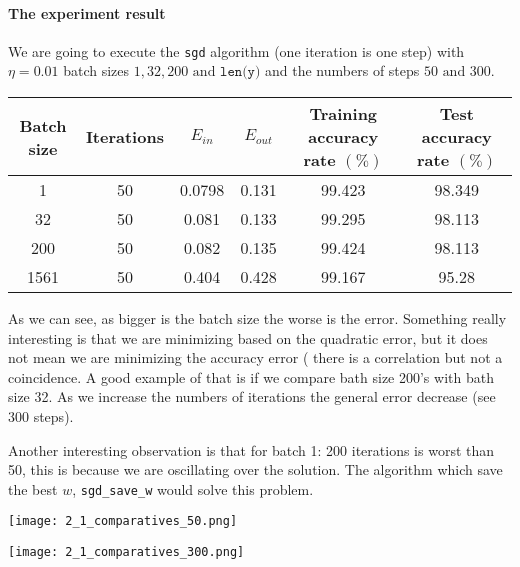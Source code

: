     \paragraph{The experiment result}  We are going to execute the \texttt{sgd} algorithm (one iteration is one step)  with $\eta = 0.01$ batch sizes $1,32, 200 \text{ and } \texttt{len(y)}$ and the numbers of steps $50 \text{ and } 300$.


   


\begin{table}[H]
\begin{tabular}{|c|c|c|c|c|c|}
\hline
   Batch size &  Iterations & $E_{in}$      & $E_{out}$                  & Training accuracy rate $(\%)$   & Test accuracy rate $(\%)$   \\ \hline
  1          &     50     &     0.0798    & 0.131                      &        99.423           & 98.349    \\ \hline
 32          &     50     &   0.081       &      0.133                 & 99.295            &   98.113       \\ \hline
200          &         50 &     0.082     &    0.135                   &      99.424          & 98.113       \\ \hline
 1561        & 50         & 0.404         &  0.428                      &   99.167        & 95.28            \\ \hline              
\end{tabular}
\end{table}


As we can see, as bigger is the batch size the worse is the error.
Something really interesting is that we are minimizing based on the quadratic error, but it does not mean we are minimizing the accuracy error ( there is a correlation but not a coincidence. A good example of that is if we compare bath size 200's with bath size 32.  
As we increase the numbers of iterations the general error decrease (see 300 steps). 


Another interesting observation is that for batch 1:   200 iterations is worst than 50, this is because we are oscillating over the solution. The algorithm which save the best $w$, \texttt{sgd\_save\_w} would solve this problem. 

\texttt{[image: 2\_1\_comparatives\_50.png]}

\texttt{[image: 2\_1\_comparatives\_300.png]}


